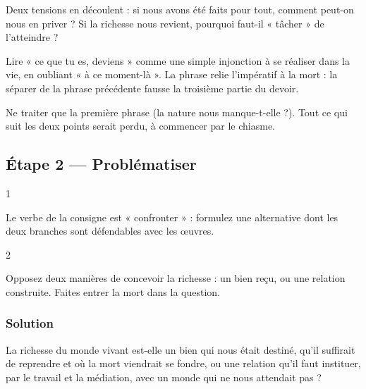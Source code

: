 \documentclass[11pt,a4paper]{article}
\begin{document}
Deux tensions en découlent : si nous avons été faits pour tout, comment peut-on nous en priver ? Si la richesse nous revient, pourquoi faut-il « tâcher » de l'atteindre ?

\begin{piege}

Lire « ce que tu es, deviens » comme une simple injonction à se réaliser dans la vie, en oubliant « à ce moment-là ». La phrase relie l'impératif à la mort : la séparer de la phrase précédente fausse la troisième partie du devoir.

\end{piege}

\begin{piege}

Ne traiter que la première phrase (la nature nous manque-t-elle ?). Tout ce qui suit les deux points serait perdu, à commencer par le chiasme.

\end{piege}

\hypertarget{uxe9tape-2-probluxe9matiser}{%
\subsection{Étape 2 --- Problématiser}\label{uxe9tape-2-probluxe9matiser}}

\begin{indication}{1}

Le verbe de la consigne est « confronter » : formulez une alternative dont les deux branches sont défendables avec les œuvres.

\end{indication}

\begin{indication}{2}

Opposez deux manières de concevoir la richesse : un bien reçu, ou une relation construite. Faites entrer la mort dans la question.

\end{indication}

\hypertarget{solution-1}{%
\subsubsection{Solution}\label{solution-1}}

La richesse du monde vivant est-elle un bien qui nous était destiné, qu'il suffirait de reprendre et où la mort viendrait se fondre, ou une relation qu'il faut instituer, par le travail et la médiation, avec un monde qui ne nous attendait pas ?
\end{document}

